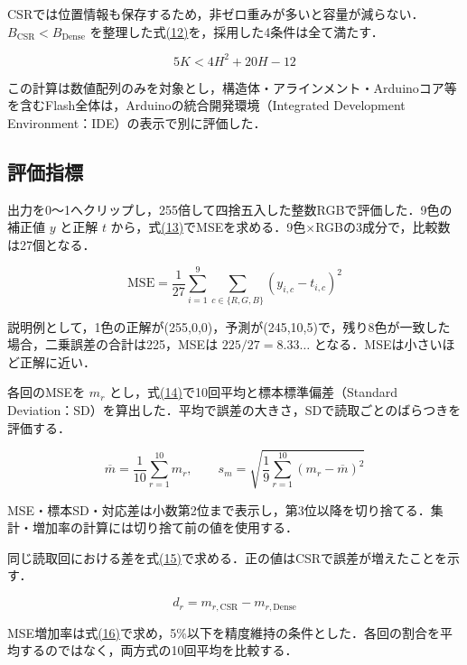 \documentclass[
  10pt,
  a4paper,
]{article}
\begin{document}
CSRでは位置情報も保存するため，非ゼロ重みが多いと容量が減らない．\(B_{\mathrm{CSR}}<B_{\mathrm{Dense}}\)
を整理した式\hyperref[eq:capacity-condition]{(12)}を，採用した4条件は全て満たす．

\begin{equation}\label{eq:capacity-condition}
5K<4H^2+20H-12
\end{equation}

この計算は数値配列のみを対象とし，構造体・アラインメント・Arduinoコア等を含むFlash全体は，Arduinoの統合開発環境（Integrated
Development Environment：IDE）の表示で別に評価した．

\subsection{評価指標}\label{ux8a55ux4fa1ux6307ux6a19}

出力を0〜1へクリップし，255倍して四捨五入した整数RGBで評価した．9色の補正値
\(y\) と正解 \(t\)
から，式\hyperref[eq:mse]{(13)}でMSEを求める．9色×RGBの3成分で，比較数は27個となる．

\begin{equation}\label{eq:mse}
\mathrm{MSE}=\frac{1}{27}\sum_{i=1}^{9}\sum_{c\in\{R,G,B\}}(y_{i,c}-t_{i,c})^2
\end{equation}

説明例として，1色の正解が(255,0,0)，予測が(245,10,5)で，残り8色が一致した場合，二乗誤差の合計は225，MSEは
\(225/27=8.33\ldots\) となる．MSEは小さいほど正解に近い．

各回のMSEを \(m_r\)
とし，式\hyperref[eq:statistics]{(14)}で10回平均と標本標準偏差（Standard
Deviation：SD）を算出した．平均で誤差の大きさ，SDで読取ごとのばらつきを評価する．

\begin{equation}\label{eq:statistics}
\overline m=\frac1{10}\sum_{r=1}^{10}m_r,\qquad
s_m=\sqrt{\frac1{9}\sum_{r=1}^{10}(m_r-\overline m)^2}
\end{equation}

MSE・標本SD・対応差は小数第2位まで表示し，第3位以降を切り捨てる．集計・増加率の計算には切り捨て前の値を使用する．

同じ読取回における差を式\hyperref[eq:paired-difference]{(15)}で求める．正の値はCSRで誤差が増えたことを示す．

\begin{equation}\label{eq:paired-difference}
d_r=m_{r,\mathrm{CSR}}-m_{r,\mathrm{Dense}}
\end{equation}

MSE増加率は式\hyperref[eq:mse-change]{(16)}で求め，5\%以下を精度維持の条件とした．各回の割合を平均するのではなく，両方式の10回平均を比較する．
\end{document}
